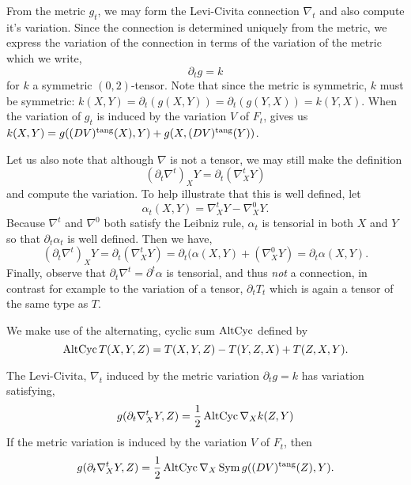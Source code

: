 From the metric \(g_t\), we may form the Levi-Civita connection \(\nabla_t\) and also compute it's variation. Since the connection is determined uniquely from the metric, we express the variation of the connection in terms of the variation of the metric which we write,
\[
\partial_t g = k
\]
for \(k\) a symmetric \((0, 2)\)-tensor. Note that since the metric is symmetric, \(k\) must be symmetric: \(k(X, Y) = \partial_t (g(X, Y)) = \partial_t (g(Y, X)) = k(Y, X)\). When the variation of \(g_t\) is induced by the variation \(V\) of \(F_t\),  gives us \(k(X, Y) = g((DV)^{\operatorname{tang}} (X), Y) + g(X, (DV)^{\operatorname{tang}} (Y))\).

\begin{rem}
Let us also note that although \(\nabla\) is not a tensor, we may still make the definition
\[
(\partial_t \nabla^t)_X Y = \partial_t(\nabla^t_X Y)
\]
and compute the variation. To help illustrate that this is well defined, let
\[
\alpha_t(X, Y) = \nabla^t_X Y - \nabla^0_X Y.
\]
Because \(\nabla^t\) and \(\nabla^0\) both satisfy the Leibniz rule, \(\alpha_t\) is tensorial in both \(X\) and \(Y\) so that \(\partial_t \alpha_t\) is well defined. Then we have,
\[
(\partial_t \nabla^t)_X Y = \partial_t(\nabla^t_X Y) = \partial_t (\alpha(X, Y) + (\nabla^0_X Y) = \partial_t \alpha (X, Y).
\]
Finally, observe that \(\partial_t \nabla^t = \partial^t \alpha\) is tensorial, and thus \emph{not} a connection, in contrast for example to the variation of a tensor, \(\partial_t T_t\) which is again a tensor of the same type as \(T\).
\end{rem}

We make use of the alternating, cyclic sum \(\operatorname{AltCyc}\) defined by
\[
\operatorname{AltCyc} T(X, Y, Z) = T(X, Y, Z) - T(Y, Z, X) + T(Z, X, Y).
\]

\begin{lemma}
The Levi-Civita, \(\nabla_t\) induced by the metric variation \(\partial_t g = k\) has variation satisfying,
\[
g(\partial_t \nabla^t_X Y, Z) = \frac{1}{2} \operatorname{AltCyc} \nabla_X k(Z, Y)
\]
If the metric variation is induced by the variation \(V\) of \(F_t\), then
\[
g(\partial_t \nabla^t_X Y, Z) = \frac{1}{2} \operatorname{AltCyc} \nabla_X \operatorname{Sym} g((DV)^{\operatorname{tang}} (Z), Y).
\]
\end{lemma}

